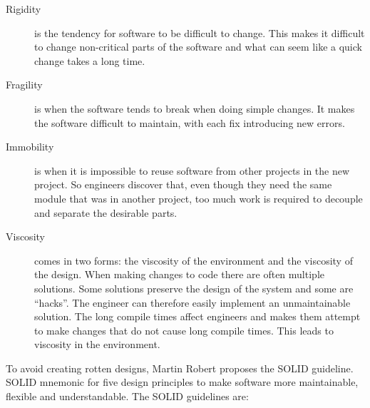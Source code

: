\begin{description}

\item[ Rigidity ] is the tendency for software to be difficult to
change. This makes it difficult to change non-critical parts of the software and
what can seem like a quick change takes a long time.

\item[ Fragility ] is when the software tends to break when doing
simple changes. It makes the software difficult to maintain, with each fix
introducing new errors.

\item[ Immobility ] is when it is impossible to reuse software from
other projects in the new project. So engineers discover that, even though they
need the same module that was in another project, too much work is required to
decouple and separate the desirable parts.

\item[ Viscosity ] comes in two forms: the viscosity of the environment and the
    viscosity of the design. When making changes to code there are often
        multiple solutions. Some solutions preserve the design of the system and
        some are ``hacks''. The engineer can therefore easily implement an
        unmaintainable solution. The long compile times affect engineers and
        makes them attempt to make changes that do not cause long compile times.
        This leads to viscosity in the environment.

\end{description}

To avoid creating rotten designs, Martin Robert proposes the SOLID guideline.
SOLID mnemonic for five design principles to make software more maintainable,
flexible and understandable. The SOLID guidelines are:

